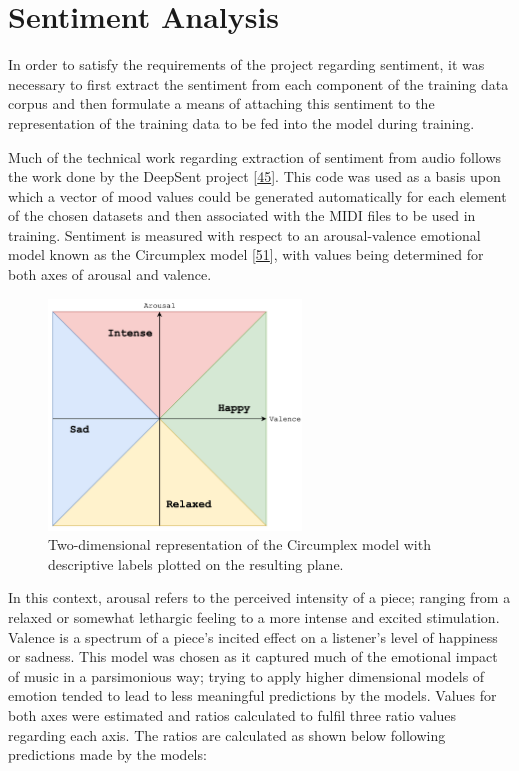 \documentclass[12pt,]{article}
\begin{document}
\hypertarget{sentiment-analysis}{%
\section{Sentiment Analysis}\label{sentiment-analysis}}

In order to satisfy the requirements of the project regarding sentiment,
it was necessary to first extract the sentiment from each component of
the training data corpus and then formulate a means of attaching this
sentiment to the representation of the training data to be fed into the
model during training.

Much of the technical work regarding extraction of sentiment from audio
follows the work done by the DeepSent project
{[}\protect\hyperlink{ref-deepsent}{45}{]}. This code was used as a
basis upon which a vector of mood values could be generated
automatically for each element of the chosen datasets and then
associated with the MIDI files to be used in training. Sentiment is
measured with respect to an arousal-valence emotional model known as the
Circumplex model
{[}\protect\hyperlink{ref-russell1980circumplex}{51}{]}, with values
being determined for both axes of arousal and valence.

\begin{figure}
\centering
\includegraphics[width=0.6\textwidth,height=\textheight]{Images/circumplex.png}
\caption{Two-dimensional representation of the Circumplex model with
descriptive labels plotted on the resulting plane.}
\end{figure}

In this context, arousal refers to the perceived intensity of a piece;
ranging from a relaxed or somewhat lethargic feeling to a more intense
and excited stimulation. Valence is a spectrum of a piece's incited
effect on a listener's level of happiness or sadness. This model was
chosen as it captured much of the emotional impact of music in a
parsimonious way; trying to apply higher dimensional models of emotion
tended to lead to less meaningful predictions by the models. Values for
both axes were estimated and ratios calculated to fulfil three ratio
values regarding each axis. The ratios are calculated as shown below
following predictions made by the models:
\end{document}

